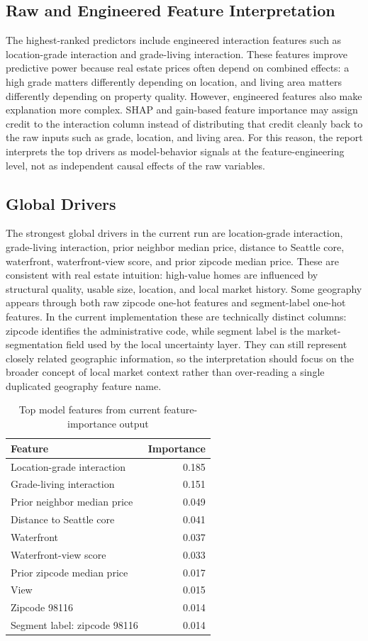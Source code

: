 \documentclass[12pt,a4paper]{article}
\begin{document}
\subsection{Raw and Engineered Feature Interpretation}
The highest-ranked predictors include engineered interaction features such as location-grade interaction and grade-living interaction. These features improve predictive power because real estate prices often depend on combined effects: a high grade matters differently depending on location, and living area matters differently depending on property quality. However, engineered features also make explanation more complex. SHAP and gain-based feature importance may assign credit to the interaction column instead of distributing that credit cleanly back to the raw inputs such as grade, location, and living area. For this reason, the report interprets the top drivers as model-behavior signals at the feature-engineering level, not as independent causal effects of the raw variables.

\subsection{Global Drivers}
The strongest global drivers in the current run are location-grade interaction, grade-living interaction, prior neighbor median price, distance to Seattle core, waterfront, waterfront-view score, and prior zipcode median price. These are consistent with real estate intuition: high-value homes are influenced by structural quality, usable size, location, and local market history. Some geography appears through both raw zipcode one-hot features and segment-label one-hot features. In the current implementation these are technically distinct columns: zipcode identifies the administrative code, while segment label is the market-segmentation field used by the local uncertainty layer. They can still represent closely related geographic information, so the interpretation should focus on the broader concept of local market context rather than over-reading a single duplicated geography feature name.

\begin{table}[H]
\centering
\caption{Top model features from current feature-importance output}
\label{tab:feature_importance}
\begin{tabular}{lr}
\toprule
\textbf{Feature} & \textbf{Importance}\\
\midrule
Location-grade interaction & 0.185\\
Grade-living interaction & 0.151\\
Prior neighbor median price & 0.049\\
Distance to Seattle core & 0.041\\
Waterfront & 0.037\\
Waterfront-view score & 0.033\\
Prior zipcode median price & 0.017\\
View & 0.015\\
Zipcode 98116 & 0.014\\
Segment label: zipcode 98116 & 0.014\\
\bottomrule
\end{tabular}
\end{table}
\end{document}
